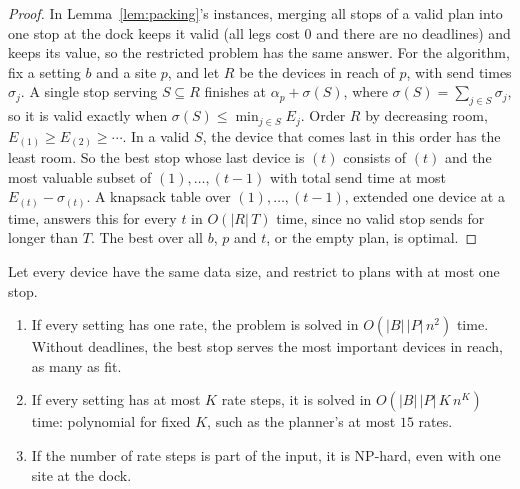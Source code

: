 \begin{proof}
In Lemma~\ref{lem:packing}'s instances, merging all stops of a valid plan
into one stop at the dock keeps it valid (all legs cost $0$ and there are no
deadlines) and keeps its value, so the restricted problem has the same
answer. For the algorithm, fix a setting $b$ and a site $p$, and let $R$ be
the devices in reach of $p$, with send times $\sigma_j$. A single stop
serving $S\subseteq R$ finishes at $\alpha_p+\sigma(S)$, where
$\sigma(S)=\sum_{j\in S}\sigma_j$, so it is valid exactly when
$\sigma(S)\le\min_{j\in S}E_j$. Order $R$ by decreasing room,
$E_{(1)}\ge E_{(2)}\ge\cdots$. In a valid $S$, the device that comes last in
this order has the least room. So the best stop whose last device is $(t)$
consists of $(t)$ and the most valuable subset of $(1),\dots,(t-1)$ with
total send time at most $E_{(t)}-\sigma_{(t)}$. A knapsack table over
$(1),\dots,(t-1)$, extended one device at a time, answers this for every
$t$ in $O(|R|\,T)$ time, since no valid stop sends for longer than $T$. The
best over all $b$, $p$ and $t$, or the empty plan, is optimal.
\end{proof}

\begin{proposition}
\label{prop:one-stop-equal}
Let every device have the same data size, and restrict to plans with at
most one stop.
\begin{enumerate}
  \item[(a)] If every setting has one rate, the problem is solved in
    $O(|B|\,|P|\,n^2)$ time. Without deadlines, the best stop serves the
    most important devices in reach, as many as fit.
  \item[(b)] If every setting has at most $K$ rate steps, it is solved in
    $O(|B|\,|P|\,K\,n^{K})$ time: polynomial for fixed $K$, such as the
    planner's at most $15$ rates.
  \item[(c)] If the number of rate steps is part of the input, it is
    NP-hard, even with one site at the dock.
\end{enumerate}
\end{proposition}

